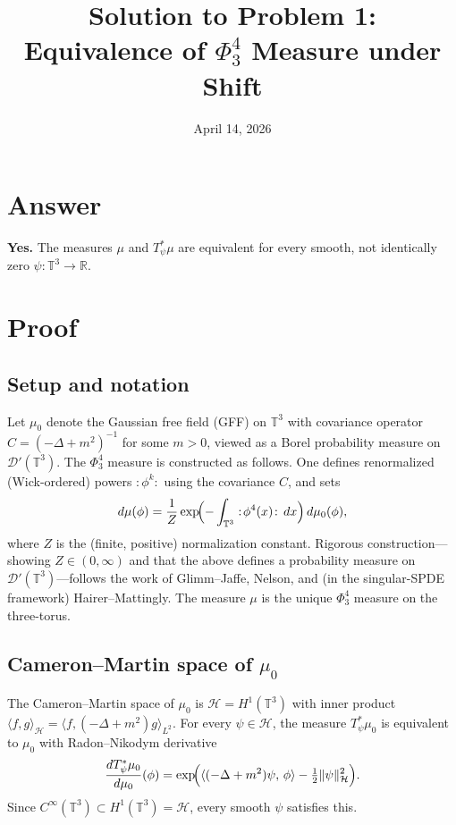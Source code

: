 \documentclass[12pt]{article}
\title{Solution to Problem 1:\\Equivalence of $\Phi^4_3$ Measure under Shift}
\author{}
\date{April 14, 2026}
\begin{document}
\maketitle

\section*{Answer}

\textbf{Yes.} The measures $\mu$ and $T_\psi^*\mu$ are equivalent for every smooth, not identically zero $\psi\colon\mathbb{T}^3\to\mathbb{R}$.

\section*{Proof}

\subsection*{Setup and notation}

Let $\mu_0$ denote the Gaussian free field (GFF) on $\mathbb{T}^3$ with covariance operator $C = (-\Delta + m^2)^{-1}$ for some $m>0$, viewed as a Borel probability measure on $\mathcal{D}'(\mathbb{T}^3)$.  The $\Phi^4_3$ measure is constructed as follows.  One defines renormalized (Wick-ordered) powers $:\!\phi^k\!:$ using the covariance $C$, and sets
\[
  d\mu(\phi) = \frac{1}{Z}\exp\!\Bigl(-\int_{\mathbb{T}^3}:\!\phi^4(x)\!:\,dx\Bigr)\,d\mu_0(\phi),
\]
where $Z$ is the (finite, positive) normalization constant.  Rigorous construction---showing $Z\in(0,\infty)$ and that the above defines a probability measure on $\mathcal{D}'(\mathbb{T}^3)$---follows the work of Glimm--Jaffe, Nelson, and (in the singular-SPDE framework) Hairer--Mattingly.  The measure $\mu$ is the unique $\Phi^4_3$ measure on the three-torus.

\subsection*{Cameron--Martin space of $\mu_0$}

The Cameron--Martin space of $\mu_0$ is $\mathcal{H} = H^1(\mathbb{T}^3)$ with inner product $\langle f,g\rangle_{\mathcal{H}} = \langle f, (-\Delta+m^2)g\rangle_{L^2}$.  For every $\psi\in\mathcal{H}$, the measure $T_\psi^*\mu_0$ is equivalent to $\mu_0$ with Radon--Nikodym derivative
\[
  \frac{dT_\psi^*\mu_0}{d\mu_0}(\phi)
  = \exp\!\Bigl(\langle(-\Delta+m^2)\psi,\,\phi\rangle - \tfrac12\|\psi\|_{\mathcal{H}}^2\Bigr).
\]
Since $C^\infty(\mathbb{T}^3)\subset H^1(\mathbb{T}^3) = \mathcal{H}$, every smooth $\psi$ satisfies this.
\end{document}
